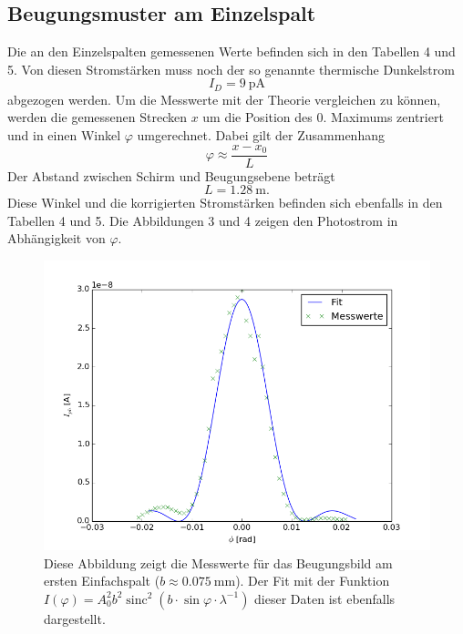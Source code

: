 \documentclass[11pt,ngerman,a4paper]{article}
\begin{document}
\subsection{Beugungsmuster am Einzelspalt}

Die an den Einzelspalten gemessenen Werte befinden sich in den Tabellen 4 und 5. Von diesen Stromstärken muss noch der so genannte thermische Dunkelstrom
\[
I_D = \SI{9}{\pico\ampere}
\]
abgezogen werden. Um die Messwerte mit der Theorie vergleichen zu können, werden die gemessenen Strecken $x$ um die Position des 0. Maximums zentriert und in einen Winkel $\varphi$ umgerechnet. Dabei gilt der Zusammenhang
\[
\varphi \approx \frac{x-x_0}{L}
\]
Der Abstand zwischen Schirm und Beugungsebene beträgt
\[
L = \SI{1.28}{\meter} \mathrm{.}
\]
Diese Winkel und die korrigierten Stromstärken befinden sich ebenfalls in den Tabellen 4 und 5. Die Abbildungen 3 und 4 zeigen den Photostrom in Abhängigkeit von $\varphi$.
\begin{figure}[H]
\centering
\includegraphics[scale=0.8]{plot0.png}
\caption{Diese Abbildung zeigt die Messwerte für das Beugungsbild am ersten Einfachspalt ($b \approx \SI{0.075}{\milli\meter}$). Der Fit mit der Funktion $I(\varphi) = A_0^2b^2\operatorname{sinc}^2(b\cdot\sin\varphi\cdot\lambda^{-1})$  dieser Daten ist ebenfalls dargestellt.}
\label{plot0}
\end{figure}
\end{document}
